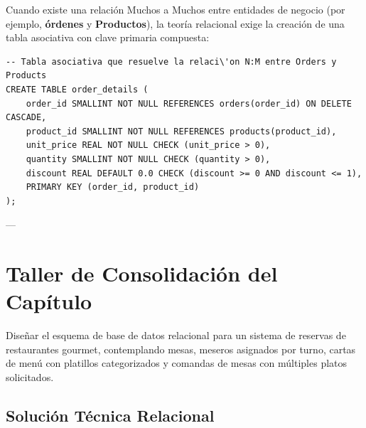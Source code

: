 Cuando existe una relaci\'on Muchos a Muchos entre entidades de negocio (por ejemplo, \textbf{\'ordenes} y \textbf{Productos}), la teor\'ia relacional exige la creaci\'on de una tabla asociativa con clave primaria compuesta:

\begin{lstlisting}[style=sqlstyle, caption={Implementaci\'on f\'isica de la tabla puente Order Details}]
-- Tabla asociativa que resuelve la relaci\'on N:M entre Orders y Products
CREATE TABLE order_details (
    order_id SMALLINT NOT NULL REFERENCES orders(order_id) ON DELETE CASCADE,
    product_id SMALLINT NOT NULL REFERENCES products(product_id),
    unit_price REAL NOT NULL CHECK (unit_price > 0),
    quantity SMALLINT NOT NULL CHECK (quantity > 0),
    discount REAL DEFAULT 0.0 CHECK (discount >= 0 AND discount <= 1),
    PRIMARY KEY (order_id, product_id)
);
\end{lstlisting}

---

\section{Taller de Consolidaci\'on del Cap\'itulo}

\begin{businessproblem}
Dise\~nar el esquema de base de datos relacional para un sistema de reservas de restaurantes gourmet, contemplando mesas, meseros asignados por turno, cartas de men\'u con platillos categorizados y comandas de mesas con m\'ultiples platos solicitados.
\end{businessproblem}

\subsection{Soluci\'on T\'ecnica Relacional}

